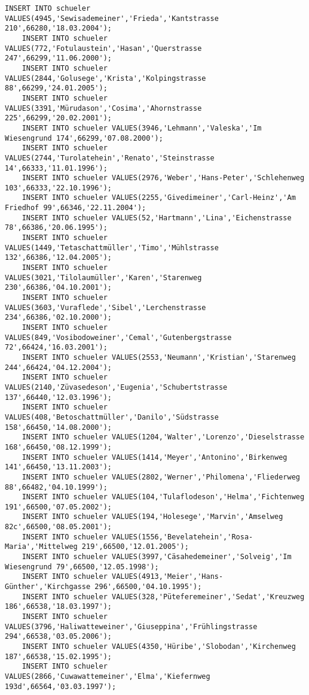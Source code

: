 \begin{lstlisting}[breaklines=True, numbers=none, basicstyle=\tiny, keepspaces=false]
	INSERT INTO schueler VALUES(4945,'Sewisademeiner','Frieda','Kantstrasse 210',66280,'18.03.2004');
	INSERT INTO schueler VALUES(772,'Fotulaustein','Hasan','Querstrasse 247',66299,'11.06.2000');
	INSERT INTO schueler VALUES(2844,'Golusege','Krista','Kolpingstrasse 88',66299,'24.01.2005');
	INSERT INTO schueler VALUES(3391,'Mürudason','Cosima','Ahornstrasse 225',66299,'20.02.2001');
	INSERT INTO schueler VALUES(3946,'Lehmann','Valeska','Im Wiesengrund 174',66299,'07.08.2000');
	INSERT INTO schueler VALUES(2744,'Turolatehein','Renato','Steinstrasse 14',66333,'11.01.1996');
	INSERT INTO schueler VALUES(2976,'Weber','Hans-Peter','Schlehenweg 103',66333,'22.10.1996');
	INSERT INTO schueler VALUES(2255,'Givedimeiner','Carl-Heinz','Am Friedhof 99',66346,'22.11.2004');
	INSERT INTO schueler VALUES(52,'Hartmann','Lina','Eichenstrasse 78',66386,'20.06.1995');
	INSERT INTO schueler VALUES(1449,'Tetaschattmüller','Timo','Mühlstrasse 132',66386,'12.04.2005');
	INSERT INTO schueler VALUES(3021,'Tilolaumüller','Karen','Starenweg 230',66386,'04.10.2001');
	INSERT INTO schueler VALUES(3603,'Vuraflede','Sibel','Lerchenstrasse 234',66386,'02.10.2000');
	INSERT INTO schueler VALUES(849,'Vosibodoweiner','Cemal','Gutenbergstrasse 72',66424,'16.03.2001');
	INSERT INTO schueler VALUES(2553,'Neumann','Kristian','Starenweg 244',66424,'04.12.2004');
	INSERT INTO schueler VALUES(2140,'Züvasedeson','Eugenia','Schubertstrasse 137',66440,'12.03.1996');
	INSERT INTO schueler VALUES(408,'Betoschattmüller','Danilo','Südstrasse 158',66450,'14.08.2000');
	INSERT INTO schueler VALUES(1204,'Walter','Lorenzo','Dieselstrasse 168',66450,'08.12.1999');
	INSERT INTO schueler VALUES(1414,'Meyer','Antonino','Birkenweg 141',66450,'13.11.2003');
	INSERT INTO schueler VALUES(2802,'Werner','Philomena','Fliederweg 88',66482,'04.10.1999');
	INSERT INTO schueler VALUES(104,'Tulaflodeson','Helma','Fichtenweg 191',66500,'07.05.2002');
	INSERT INTO schueler VALUES(194,'Holesege','Marvin','Amselweg 82c',66500,'08.05.2001');
	INSERT INTO schueler VALUES(1556,'Bevelatehein','Rosa-Maria','Mittelweg 219',66500,'12.01.2005');
	INSERT INTO schueler VALUES(3997,'Cäsahedemeiner','Solveig','Im Wiesengrund 79',66500,'12.05.1998');
	INSERT INTO schueler VALUES(4913,'Meier','Hans-Günther','Kirchgasse 296',66500,'04.10.1995');
	INSERT INTO schueler VALUES(328,'Püteferemeiner','Sedat','Kreuzweg 186',66538,'18.03.1997');
	INSERT INTO schueler VALUES(3796,'Haliwatteweiner','Giuseppina','Frühlingstrasse 294',66538,'03.05.2006');
	INSERT INTO schueler VALUES(4350,'Hüribe','Slobodan','Kirchenweg 187',66538,'15.02.1995');
	INSERT INTO schueler VALUES(2866,'Cuwawattemeiner','Elma','Kiefernweg 193d',66564,'03.03.1997');

\end{lstlisting}
